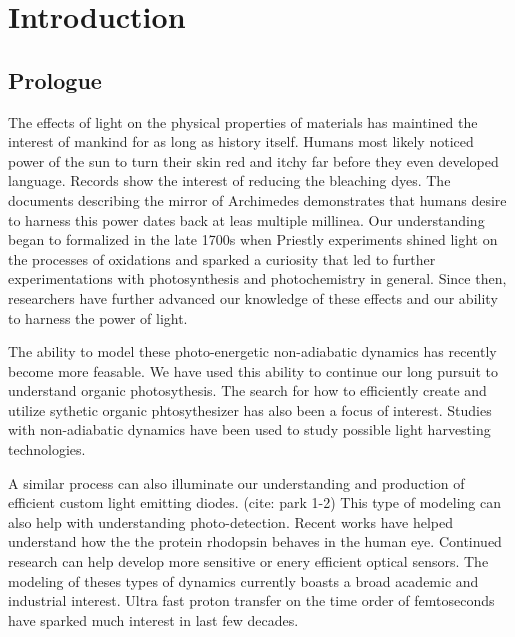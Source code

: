 \chapter{Introduction} \label{introduction}

\section{Prologue}

The effects of light on the physical properties of materials has maintined the interest of mankind for as long as history itself.
Humans most likely noticed power of the sun to turn their skin red and itchy far before they even developed language.
Records show the interest of reducing the bleaching dyes.
The documents describing the mirror of Archimedes demonstrates that humans desire to harness this power dates back at leas multiple millinea.
Our understanding began to formalized in the late 1700s when Priestly experiments shined light on the processes of oxidations and sparked a curiosity that led to further experimentations with photosynthesis and photochemistry in general.
Since then, researchers have further advanced our knowledge of these effects and our ability to harness the power of light.

The ability to model these photo-energetic non-adiabatic dynamics has recently become more feasable.
We have used this ability to continue our long pursuit to understand organic photosythesis. \cite{zheng2017photoinduced,caycedo2010light}
The search for how to efficiently create and utilize sythetic organic phtosythesizer has also been a focus of interest. \cite{balzani2008photochemical,engel2007evidence}
Studies with non-adiabatic dynamics have been used to study possible light harvesting technologies. \cite{ishida11_effic_excit_energ_trans_react,katan2005effects}

A similar process can also illuminate our understanding and production of efficient custom light emitting diodes. (cite: park 1-2)
This type of modeling can also help with understanding photo-detection.
Recent works have helped understand how the the protein rhodopsin behaves in the human eye.\cite{weingart2012modelling}
Continued research can help develop more sensitive or enery efficient optical sensors. 
The modeling of theses types of dynamics currently boasts a broad academic and industrial interest. \cite{tavernelli2010nonadiabatic,tavernelli2015nonadiabatic,nelson2020non}
Ultra fast proton transfer on the time order of femtoseconds have sparked much interest in last few decades.\cite{schwartz1992direct}

